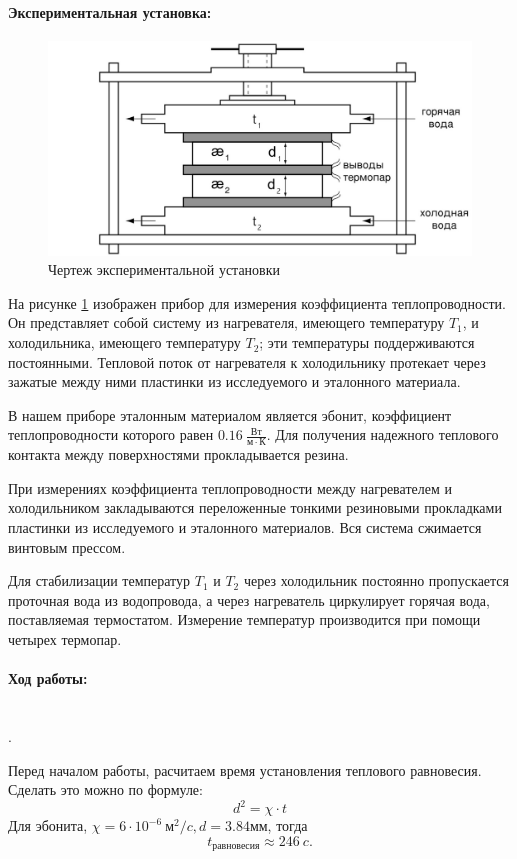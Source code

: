 \documentclass[a4paper, 12pt]{article}
\newcommand{\parag}[1]{\paragraph*{#1:}}
\newcounter{Points}
\newcommand{\point}{\arabic{Points}. \addtocounter{Points}{1}}
\begin{document}
\parag{Экспериментальная установка}

\begin{figure}[H]
	\begin{center}
		\includegraphics[width=15cm]{setup.jpg}
		\caption{Чертеж экспериментальной установки}
        \label{img:setup}
	\end{center}
\end{figure}

На рисунке \ref{img:setup} изображен прибор для измерения коэффициента теплопроводности. Он представляет собой систему из нагревателя, имеющего температуру $ T_1 $, и холодильника, имеющего температуру $ T_2 $; эти температуры поддерживаются постоянными. Тепловой поток от нагревателя к холодильнику протекает через зажатые между ними пластинки из исследуемого и эталонного материала. 

В нашем приборе эталонным материалом является эбонит, коэффициент теплопроводности которого равен $ 0.16~\frac{Вт}{м \cdot К}$. Для получения надежного теплового контакта между поверхностями прокладывается резина. 

При измерениях коэффициента теплопроводности между нагревателем и холодильником закладываются переложенные тонкими резиновыми прокладками пластинки из исследуемого и эталонного материалов. Вся система сжимается винтовым прессом. 

Для стабилизации температур $ T_1 $ и $ T_2 $ через холодильник постоянно пропускается проточная вода из водопровода, а через нагреватель циркулирует горячая вода, поставляемая термостатом. Измерение температур производится при помощи четырех термопар.

\parag {Ход работы} ~\\
\point Перед началом работы, расчитаем время установления теплового равновесия. Сделать это можно по формуле:
$$d^2 = \chi \cdot t$$
Для эбонита, $\chi = 6 \cdot 10^{-6}~м^2/c, d = 3.84 мм$, тогда 
$$t_{равновесия} \approx 246~c.$$
\end{document}
